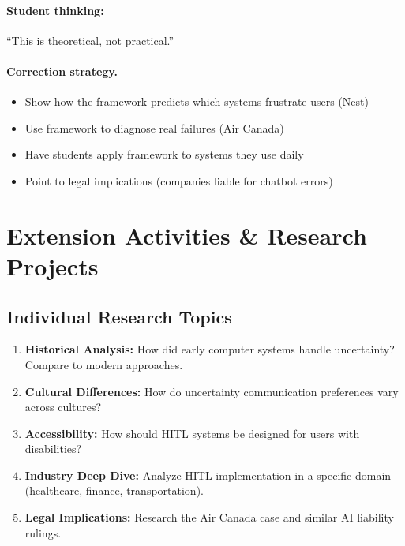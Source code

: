 \paragraph{Student thinking:} ``This is theoretical, not practical.''

\paragraph{Correction strategy.}
\begin{itemize}
    \item Show how the framework predicts which systems frustrate users (Nest)
    \item Use framework to diagnose real failures (Air Canada)
    \item Have students apply framework to systems they use daily
    \item Point to legal implications (companies liable for chatbot errors)
\end{itemize}

\section{Extension Activities \& Research Projects}

\subsection{Individual Research Topics}
\begin{enumerate}
    \item \textbf{Historical Analysis:} How did early computer systems handle uncertainty? Compare to modern approaches.
    \item \textbf{Cultural Differences:} How do uncertainty communication preferences vary across cultures?
    \item \textbf{Accessibility:} How should HITL systems be designed for users with disabilities?
    \item \textbf{Industry Deep Dive:} Analyze HITL implementation in a specific domain (healthcare, finance, transportation).
    \item \textbf{Legal Implications:} Research the Air Canada case and similar AI liability rulings.
\end{enumerate}

